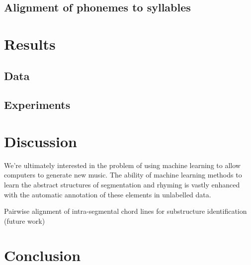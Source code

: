\documentclass[12pt]{article}
\begin{document}
\subsection{Alignment of phonemes to syllables}

\section{Results}

\subsection{Data}

\subsection{Experiments}

\section{Discussion}
We're ultimately interested in the problem of using machine learning to allow computers to generate new music. The ability of machine learning methods to learn the abstract structures of segmentation and rhyming is vastly enhanced with the automatic annotation of these elements in unlabelled data.

Pairwise alignment of intra-segmental chord lines for substructure identification (future work)

\section{Conclusion}
\end{document}
